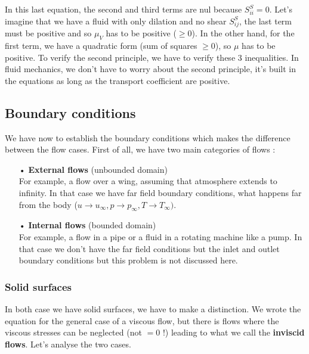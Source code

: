 			In this last equation, the second and third terms are nul because $S_{ii}^S=0$. Let's imagine that we have a fluid with only dilation and no shear $S_{ij}^S$, the last term must be positive and so $\mu _V$ has to be positive ($\geq 0$). In the other hand, for the first term, we have a quadratic form (sum of squares $\geq 0$), so $\mu$ has to be positive. To verify the second principle, we have to verify these 3 inequalities. In fluid mechanics, we don't have to worry about the second principle, it's built in the equations as long as the transport coefficient are positive.  
			
	\subsection{Boundary conditions}
		We have now to establish the boundary conditions which makes the difference between the flow cases. First of all, we have two main categories of flows : 
		\begin{itemize}
			\item[•] \textbf{External flows} (unbounded domain)\\
				For example, a flow over a wing, assuming that atmosphere extends to infinity. In that case we have far field boundary conditions, what happens far from the body ($u\rightarrow u_\infty, p\rightarrow p_\infty, T\rightarrow T_\infty)$. 
			
			\item[•] \textbf{Internal flows} (bounded domain)\\
				For example, a flow in a pipe or a fluid in a rotating machine like a pump. In that case we don't have the far field conditions but the inlet and outlet boundary conditions but this problem is not discussed here. 
		\end{itemize}
		
		\subsubsection{Solid surfaces}
			In both case we have solid surfaces, we have to make a distinction. We wrote the equation for the general case of a viscous flow, but there is flows where the viscous stresses can be neglected (not $=0$ !) leading to what we call the \textbf{inviscid flows}. Let's analyse the two cases. 
			
